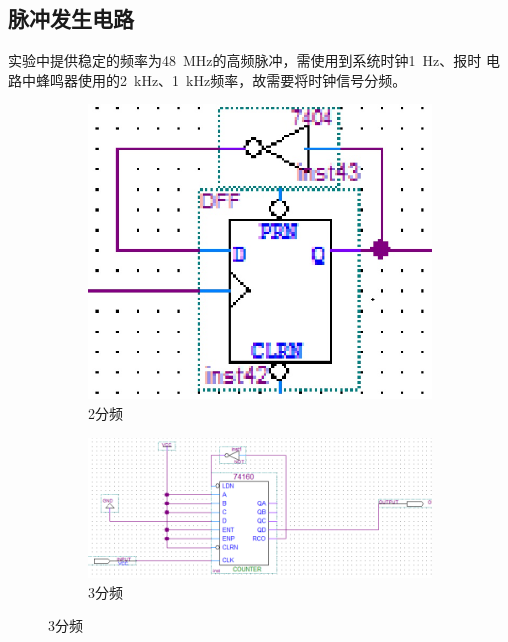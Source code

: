 \documentclass[twoside, openright]{article}
\begin{document}
\subsection{脉冲发生电路}%
\label{sub:脉冲发生电路}

实验中提供稳定的频率为\SI{48}{\MHz}的高频脉冲，需使用到系统时钟\SI{1}{\Hz}、报时
电路中蜂鸣器使用的\SI{2}{\kHz}、\SI{1}{\kHz}频率，故需要将时钟信号分频。

\begin{figure}[htbp]
	\centering
	\begin{subfigure}[htbp]{.45\linewidth}
		\centering
		\includegraphics[width=\linewidth]{2.jpg}
		\caption{2分频}
		\label{fig:2分频}
	\end{subfigure}
	\quad
	\begin{subfigure}[htbp]{.45\linewidth}
		\centering
		\includegraphics[width=\linewidth]{3.png}
		\caption{3分频}
		\label{fig:3分频}
	\end{subfigure}


\end{figure}
\end{document}
